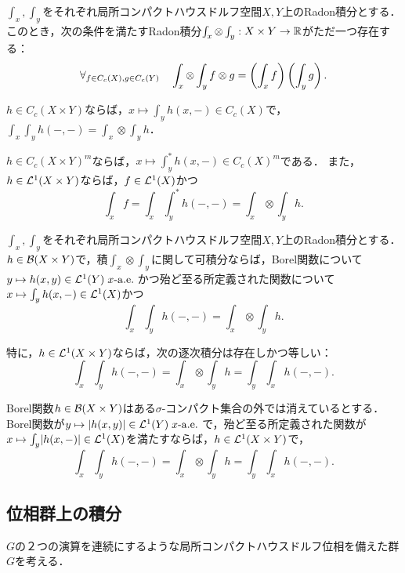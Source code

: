 \documentclass[uplatex,dvipdfmx]{jsreport}
\begin{document}
\begin{proposition}
    $\int_x,\int_y$をそれぞれ局所コンパクトハウスドルフ空間$X,Y$上のRadon積分とする．
    このとき，次の条件を満たすRadon積分$\int_x\otimes\int_y:X\times Y\to\mathbb{R}$がただ一つ存在する：
    \[\forall_{f\in C_c(X),g\in C_c(Y)}\quad\int_x\otimes\int_yf\otimes g=\left(\int_xf\right)\left(\int_yg\right).\]
\end{proposition}

\begin{lemma}
    $h\in C_c(X\times Y)$ならば，$x\mapsto\int_yh(x,-)\in C_c(X)$で，$\int_x\int_yh(-,-)=\int_x\otimes\int_yh$．
\end{lemma}

\begin{lemma}
    $h\in C_c(X\times Y)^m$ならば，$x\mapsto\int_y^*h(x,-)\in C_c(X)^m$である．
    また，$h\in\mathcal{L}^1(X\times Y)$ならば，$f\in\mathcal{L}^1(X)$かつ
    \[\int_xf=\int_x\int_y^*h(-,-)=\int_x\otimes\int_yh.\]
\end{lemma}

\begin{theorem}[Fubini]
    $\int_x,\int_y$をそれぞれ局所コンパクトハウスドルフ空間$X,Y$上のRadon積分とする．
    $h\in\mathcal{B}(X\times Y)$で，積$\int_x\otimes\int_y$に関して可積分ならば，Borel関数について$y\mapsto h(x,y)\in\mathcal{L}^1(Y)\;x\text{-}\mathrm{a.e.}\;$かつ殆ど至る所定義された関数について$x\mapsto\int_yh(x,-)\in\mathcal{L}^1(X)$かつ
    \[\int_x\int_yh(-,-)=\int_x\otimes\int_yh.\]
\end{theorem}
\begin{remarks}
    特に，$h\in\mathcal{L}^1(X\times Y)$ならば，次の逐次積分は存在しかつ等しい：\[\int_x\int_yh(-,-)=\int_x\otimes\int_yh=\int_y\int_xh(-,-).\]
\end{remarks}

\begin{corollary}[Tonelli]
    Borel関数$h\in\mathcal{B}(X\times Y)$はある$\sigma$-コンパクト集合の外では消えているとする．
    Borel関数が$y\mapsto\lvert h(x,y)\rvert\in\mathcal{L}^1(Y)\;x\text{-}\mathrm{a.e.}\;$で，殆ど至る所定義された関数が$x\mapsto\int_y\lvert h(x,-)\rvert\in\mathcal{L}^1(X)$を満たすならば，$h\in\mathcal{L}^1(X\times Y)$で，
    \[\int_x\int_yh(-,-)=\int_x\otimes\int_yh=\int_y\int_xh(-,-).\]
\end{corollary}

\subsection{位相群上の積分}

\begin{tcolorbox}[colframe=ForestGreen, colback=ForestGreen!10!white,breakable,colbacktitle=ForestGreen!40!white,coltitle=black,fonttitle=\bfseries\sffamily,
title=]
    $G$の２つの演算を連続にするような局所コンパクトハウスドルフ位相を備えた群$G$を考える．
\end{tcolorbox}
\end{document}
